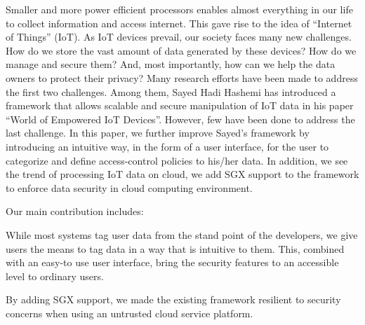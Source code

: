 Smaller and more power efficient processors enables almost everything in our life to collect information and access internet. This gave rise to the idea of “Internet of Things” (IoT). 
As IoT devices prevail, our society faces many new challenges. How do we store the vast amount of data generated by these devices? How do we manage and secure them? And, most importantly, how can we help the data owners to protect their privacy? Many research efforts have been made to address the first two challenges. Among them, Sayed Hadi Hashemi has introduced a framework that allows scalable and secure manipulation of IoT data in his paper “World of Empowered IoT Devices”. However, few have been done to address the last challenge. In this paper, we further improve Sayed’s framework by introducing an intuitive way, in the form of a user interface, for the user to categorize and define access-control policies to his/her data. In addition, we see the trend of processing IoT data on cloud, we add SGX support to the framework to enforce data security in cloud computing environment.

Our main contribution includes:
\item While most systems tag user data from the stand point of the developers, we give users the means to tag data in a way that is intuitive to them. This, combined with an easy-to use user interface, bring the security features to an accessible level to ordinary users.

\item By adding SGX support, we made the existing framework resilient to security concerns when using an untrusted cloud service platform.
